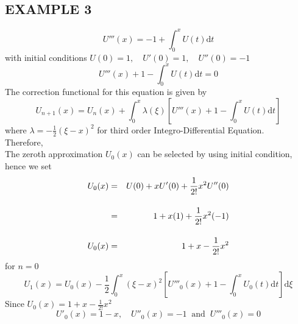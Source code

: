 \documentclass[12pt]{report}
\newcommand{\spn}[1]{\\[#1cm]}
\newcommand{\dsp}{\displaystyle}
\newcommand{\IDE}{Integro-Differential Equation}
\begin{document}
	\subsection{EXAMPLE 3}
	\begin{equation*}
		U'''(x) = - 1 + \int_0^x U(t)\text{d}t
	\end{equation*}
	with initial conditions $U(0)=1, \quad U'(0)=1, \quad U''(0)=-1$
	\begin{equation}
		U'''(x)  + 1 - \int_0^x U(t)\text{d}t = 0 \label{eq:3_11}
	\end{equation}
	The correction functional for this equation is given by
	\begin{equation}
		U_{n+1}(x) = U_n(x) + \int_0^x \lambda(\xi)\left[U'''(x) + 1 - \int_0^xU(t)\text{d}t\right]
	\end{equation}
	where $\dsp \lambda = - \frac{1}{2}(\xi - x)^2$ for third order \IDE.\\
	\newpage
	Therefore,\\
	The zeroth approximation $U_0(x)$ can be selected by using initial condition, hence we set
	\begin{eqnarray}
		U_0(x) &=&U(0) + xU'(0) + \frac{1}{2!}x^2U''(0) \notag \spn{0.4}
		&=& 1 + x(1) + \frac{1}{2!}x^2(-1) \notag \spn{0.4}
		U_0(x) &=& 1 + x - \frac{1}{2!}x^2 \notag
	\end{eqnarray}
	for $n=0$
	\begin{equation*}
		U_1(x) = U_0(x) - \frac{1}{2} \int_0^x \left(\xi-x\right)^2 \left[U'''_0(x) + 1 - \int_0^x U_0(t) \text{d}t\right] \text{d}\xi
	\end{equation*}
		Since $\dsp U_0(x) = 1 + x - \frac{1}{2!}x^2$ \begin{equation*}
		U'_0(x)=1-x, \quad U''_0(x)=-1 ~\text{ and } ~U'''_0(x)=0
	\end{equation*}
\end{document}
